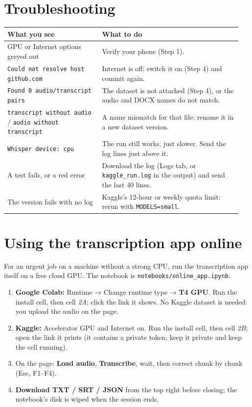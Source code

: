 \documentclass[11pt]{article}
\begin{document}
\section{Troubleshooting}\label{troubleshooting}

\begin{longtable}[]{@{}>{\raggedright\arraybackslash}p{0.38\linewidth}>{\raggedright\arraybackslash}p{0.57\linewidth}@{}}
\toprule\noalign{}
What you see & What to do \\
\midrule\noalign{}
\endhead
\bottomrule\noalign{}
\endlastfoot
GPU or Internet options greyed out & Verify your phone (Step 1). \\
\texttt{Could not resolve host github.com} & Internet is off: switch it on (Step 4) and commit again. \\
\texttt{Found 0 audio/transcript pairs} & The dataset is not attached (Step 4), or the audio and DOCX names do not match. \\
\texttt{transcript without audio} / \texttt{audio without transcript} & A name mismatch for that file; rename it in a new dataset version. \\
\texttt{Whisper device: cpu} & The run still works, just slower. Send the log lines just above it. \\
A test fails, or a red error & Download the log (Logs tab, or \texttt{kaggle\_run.log} in the output) and send the last 40 lines. \\
The version fails with no log & Kaggle's 12-hour or weekly quota limit: rerun with \texttt{MODELS=small}. \\
\end{longtable}

\hypertarget{online-app}{%
\section{Using the transcription app online}\label{online-app}}

For an urgent job on a machine without a strong CPU, run the transcription app itself on a free cloud GPU. The notebook is \texttt{notebooks/online\_app.ipynb}.

\begin{enumerate}
\tightlist
\item
  \textbf{Google Colab:} Runtime → Change runtime type → \textbf{T4 GPU}. Run the install cell, then cell \emph{2A}; click the link it shows. No Kaggle dataset is needed: you upload the audio on the page.
\item
  \textbf{Kaggle:} Accelerator GPU and Internet on. Run the install cell, then cell \emph{2B}; open the link it prints (it contains a private token; keep it private and keep the cell running).
\item
  On the page: \textbf{Load audio}, \textbf{Transcribe}, wait, then correct chunk by chunk (Esc, F1--F4).
\item
  \textbf{Download TXT / SRT / JSON} from the top right before closing; the notebook's disk is wiped when the session ends.
\end{enumerate}
\end{document}
